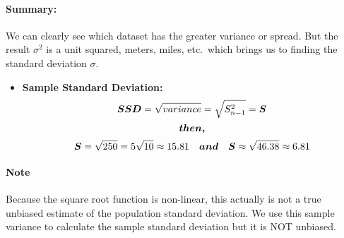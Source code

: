 \documentclass[12pt]{article}
\newcommand*{\mB}[1]{\ifmmode\bm{#1}\else\textbf{#1}\fi}
\begin{document}
\paragraph{Summary:}%

We can clearly see which dataset has the greater variance or spread.
But the result $\sigma^{2}$ is a unit squared, meters, miles, etc.\
which brings us to finding the standard deviation $\sigma$.

	\begin{itemize}
		\item\textbf{Sample Standard Deviation:}
			\[
				\mB{SSD}=\sqrt{variance}=\sqrt{S_{n-1}^{2}}= \mB{S}
			\]
			\[
				\quad\mB{then, }\quad
			\]
			\[
				\mB{S} = \sqrt{250} = 5\sqrt{10} \approx 15.81
				\quad\mB{and}\quad \mB{S} \approx \sqrt{46.38} \approx 6.81
			\]
	\end{itemize}

\paragraph{Note}%

Because the square root function is non-linear, this actually is not
a true unbiased estimate of the population standard deviation. We use
this sample variance to calculate the sample standard deviation but it
is NOT unbiased.

\endgroup
\end{document}
